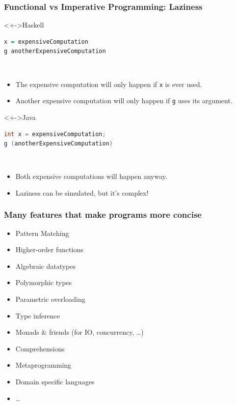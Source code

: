 \documentclass{beamer}
\begin{document}
\begin{frame}[fragile]
  \frametitle{Functional vs Imperative Programming: Laziness}
  \begin{block}<+->{Haskell}
    \begin{minipage}[t]{0.45\linewidth}
\begin{lstlisting}[language=Haskell]
x = expensiveComputation
g anotherExpensiveComputation
\end{lstlisting}
    \end{minipage}
    ~
    \begin{minipage}[t]{0.45\linewidth}
      \begin{itemize}
      \item The expensive computation will only happen if \texttt{x}
        is ever used.
      \item Another expensive computation will only happen if
        \texttt{g} uses its argument.
      \end{itemize}
    \end{minipage}
  \end{block}
  \begin{block}<+->{Java}
    \begin{minipage}[t]{0.45\linewidth}
\begin{lstlisting}[language=Java]
int x = expensiveComputation;
g (anotherExpensiveComputation)
\end{lstlisting}
    \end{minipage}
    ~
    \begin{minipage}[t]{0.45\linewidth}
      \begin{itemize}
      \item Both expensive computations will happen anyway.
      \item Laziness can be simulated, but it's complex!
      \end{itemize}
    \end{minipage}
  \end{block}
\end{frame}

\begin{frame}
  \frametitle{Many features that make programs more concise}
  \begin{itemize}
  \item Pattern Matching
  \item Higher-order functions
  \item Algebraic datatypes
  \item Polymorphic types
  \item Parametric overloading
  \item Type inference
  \item Monads \& friends (for IO, concurrency, \dots)
  \item Comprehensions
  \item Metaprogramming
  \item Domain specific languages
  \item \dots
  \end{itemize}
\end{frame}
\end{document}
